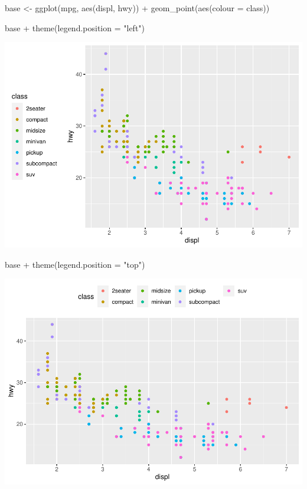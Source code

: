 \documentclass[
]{article}
\newenvironment{Shaded}{\begin{snugshade}}{\end{snugshade}}
\newcommand{\AttributeTok}[1]{\textcolor[rgb]{0.77,0.63,0.00}{#1}}
\newcommand{\FunctionTok}[1]{\textcolor[rgb]{0.00,0.00,0.00}{#1}}
\newcommand{\NormalTok}[1]{#1}
\newcommand{\OtherTok}[1]{\textcolor[rgb]{0.56,0.35,0.01}{#1}}
\newcommand{\SpecialCharTok}[1]{\textcolor[rgb]{0.00,0.00,0.00}{#1}}
\newcommand{\StringTok}[1]{\textcolor[rgb]{0.31,0.60,0.02}{#1}}
\begin{document}
\begin{Shaded}
\begin{Highlighting}[]
\NormalTok{base }\OtherTok{\textless{}{-}} \FunctionTok{ggplot}\NormalTok{(mpg, }\FunctionTok{aes}\NormalTok{(displ, hwy)) }\SpecialCharTok{+}
  \FunctionTok{geom\_point}\NormalTok{(}\FunctionTok{aes}\NormalTok{(}\AttributeTok{colour =}\NormalTok{ class))}

\NormalTok{base }\SpecialCharTok{+} \FunctionTok{theme}\NormalTok{(}\AttributeTok{legend.position =} \StringTok{"left"}\NormalTok{)}
\end{Highlighting}
\end{Shaded}

\includegraphics{Assignments_files/figure-latex/unnamed-chunk-64-1.pdf}

\begin{Shaded}
\begin{Highlighting}[]
\NormalTok{base }\SpecialCharTok{+} \FunctionTok{theme}\NormalTok{(}\AttributeTok{legend.position =} \StringTok{"top"}\NormalTok{)}
\end{Highlighting}
\end{Shaded}

\includegraphics{Assignments_files/figure-latex/unnamed-chunk-64-2.pdf}
\end{document}
